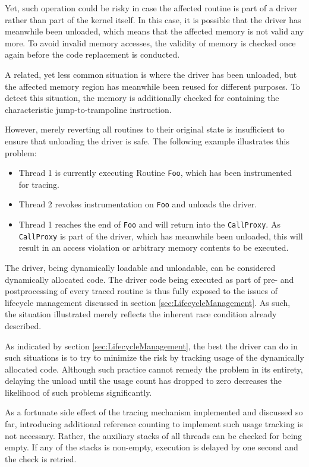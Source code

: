 Yet, such operation could be risky in case the affected routine is part of 
a driver rather than part of the kernel itself. In this case, it is possible
that the driver has meanwhile been unloaded, which means that the affected memory
is not valid any more. To avoid invalid memory accesses, the validity of memory
is checked once again before the code replacement is conducted.

A related, yet less common situation is where the driver has been unloaded, but the
affected memory region has meanwhile been reused for different purposes. To detect
this situation, the memory is additionally checked for containing the characteristic
jump-to-trampoline instruction.

However, merely reverting
all routines to their original state is insufficient to ensure that 
unloading the driver is safe. The following example illustrates this problem:

\begin{itemize}
	\item Thread 1 is currently executing Routine \verb|Foo|, which has been
				instrumented for tracing.
	\item Thread 2 revokes instrumentation on \verb|Foo| and unloads the
				driver.
	\item Thread 1 reaches the end of \verb|Foo| and will return into 
				the \verb|CallProxy|. As \verb|CallProxy| is part of the driver, which has 
				meanwhile been unloaded, this will result in an access violation
				or arbitrary memory contents to be executed.
\end{itemize}

The driver, being dynamically loadable and unloadable, can be considered 
dynamically allocated code. The driver code being executed as part of 
pre- and postprocessing of every traced routine is thus fully exposed
to the issues of lifecycle management discussed in section 
\ref{sec:LifecycleManagement}. As such, the situation illustrated 
merely reflects the inherent race condition already described.

As indicated by section \ref{sec:LifecycleManagement}, the best the
driver can do in such situations is to try to minimize the risk by
tracking usage of the dynamically allocated code. Although such
practice cannot remedy the problem in its entirety, delaying the unload
until the usage count has dropped to zero decreases the likelihood
of such problems significantly.

As a fortunate side effect of the tracing mechanism implemented and discussed so far, 
introducing additional reference counting to implement such usage
tracking is not necessary. Rather, the auxiliary stacks of all
threads can be checked for being empty. If any of the stacks is
non-empty, execution is delayed by one second and the check is retried.

